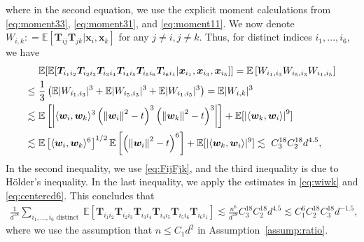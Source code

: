 \documentclass[twoside,11pt]{article}
\newcommand{\norm}[1]{\left\|#1\right\|}
\newcommand{\bw}{\boldsymbol{w}}
\newcommand{\E}{\mathbb{E}}
\def\bw{{\boldsymbol w}}
\def\bx{{\boldsymbol x}}
\def\T{{\mathbb T}}
\def\T{{\mathbb T}}
\renewcommand{\T}{\boldsymbol{T}}
\newcommand{\1}{\mathbf{1}}
\begin{document}
\begin{enumerate}[label=\textbf{Case (\roman*).},leftmargin=0ex, itemindent=12ex]
where in the second equation, we use the explicit moment calculations from \eqref{eq:moment33}, \eqref{eq:moment31}, and \eqref{eq:moment11}.  We now denote $W_{i,k}: = \E [\T_{ij}\T_{jk}| \bx_i,\bx_k]$ for any $j\not=i, j\not=k$.  Thus, for distinct indices $i_1,\dots, i_6$, we have 
\begin{align}
&\E[\E[\T_{i_1i_2}\T_{i_2i_3}\T_{i_3i_4}\T_{i_4i_5}\T_{i_5i_6}\T_{i_6i_1}| \bx_{i_1},\bx_{i_3},\bx_{i_5}]]=\E\left[W_{i_1,i_3}W_{i_5,i_3}W_{i_1,i_5}\right]  \notag \\
\le~ &\frac{1}{3} \left( \E|W_{i_1,i_3}|^{3}+ \E|W_{i_5,i_3}|^{3}+\E|W_{i_1,i_5}|^{3}\right)=\E|W_{i,k}|^{3} \notag \\
\lesssim ~ &\E\left[\left|\langle \bw_i,\bw_k\rangle^3\left(\norm{\bw_i}^2-t\right)^3\left(\norm{\bw_k}^2-t\right)^3\right|\right]+ \E[\left|\langle \bw_k,\bw_i\rangle\right|^9]  \notag  \\
 \lesssim ~&\E\left[\langle \bw_i,\bw_k\rangle^6\right]^{1/2}\E\left[\left(\norm{\bw_i}^2-t\right)^6\right]+ \E[|\langle \bw_k,\bw_i\rangle|^9]
   \lesssim ~ C_3^{18}C_2^{18}d^{4.5}, \label{eq:general_trace}
\end{align}
 In the second inequality, we use \eqref{eq:FijFjk}, and the third inequality is due to Hölder's inequality. In the last inequality,  we apply the estimates in \eqref{eq:wiwk} and \eqref{eq:centered6}.  This concludes that
 \begin{align}\label{eq:distinct_T}
 \frac{1}{d^{18}} \sum_{i_1,\dots,  i_6 \text{ distinct }} \E[\T_{i_1i_2}\T_{i_2i_3}\T_{i_3i_4}\T_{i_4i_5}\T_{i_5i_6}\T_{i_6i_1}]\lesssim \frac{n^6}{d^{18}} C_3^{18} C_2^{18}d^{4.5}\lesssim C_1^{6}C_2^{18} C_{3}^{18}d^{-1.5},
 \end{align}
where we use the assumption that $n\leq C_1d^2$ in Assumption~\ref{assump:ratio}.
 

\end{enumerate}
\end{document}
